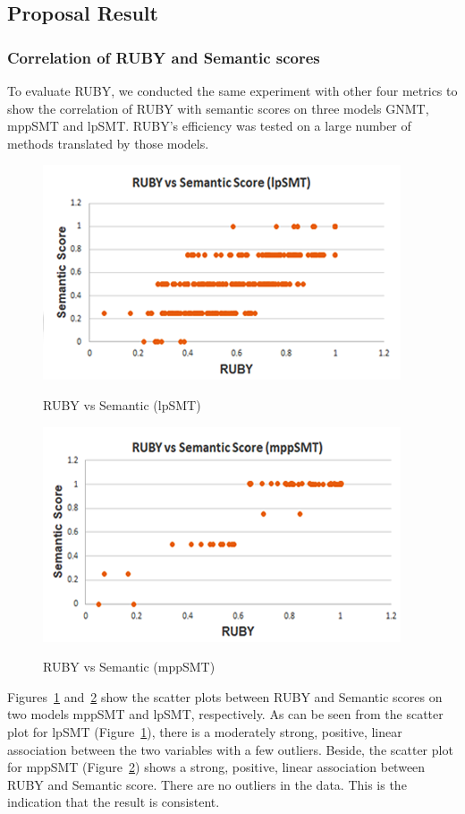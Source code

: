 \subsection{Proposal Result}
\subsubsection{Correlation of RUBY and Semantic scores}
To evaluate RUBY, we conducted the same experiment with other four
metrics to show the correlation of RUBY with semantic scores on three
models GNMT, mppSMT and lpSMT. RUBY's efficiency was tested on a large number
of methods translated by those models. 

\begin{figure}[t]
\caption{RUBY vs Semantic (lpSMT)}
\centering
\includegraphics{img/rubyvssem_lpSMT.png}
\label{fig:RubySemlpSMT}
\end{figure}

\begin{figure}[t]
\caption{RUBY vs Semantic (mppSMT)}
\centering
\includegraphics{img/rubyvssem_mppSMT.png}
\label{fig:RubySemMppSMT}
\end{figure}

Figures~\ref{fig:RubySemlpSMT} and~\ref{fig:RubySemMppSMT} show the
scatter plots between RUBY and Semantic scores on two models mppSMT
and lpSMT, respectively. As can be seen from the scatter plot for
lpSMT (Figure~\ref{fig:RubySemlpSMT}), there is a moderately strong,
positive, linear association between the two variables with a few
outliers.  Beside, the scatter plot for mppSMT
(Figure~\ref{fig:RubySemMppSMT}) shows a strong, positive, linear
association between RUBY and Semantic score. There are no outliers in
the data. This is the indication that the result is consistent.

